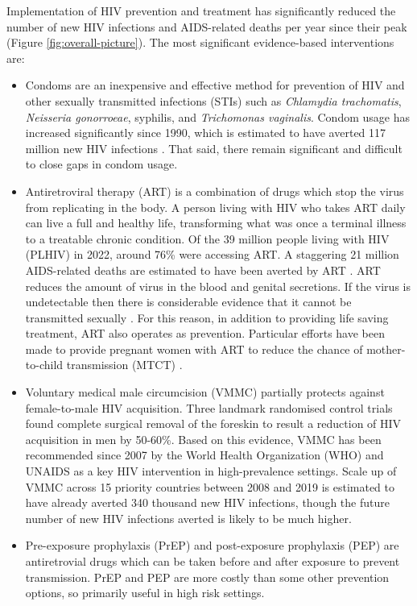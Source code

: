 \documentclass[a4paper, nobind]{templates/ociamthesis}
\providecommand{\tightlist}{%
  \setlength{\itemsep}{0pt}\setlength{\parskip}{0pt}}
\begin{document}
Implementation of HIV prevention and treatment has significantly reduced the number of new HIV infections and AIDS-related deaths per year since their peak (Figure \ref{fig:overall-picture}).
The most significant evidence-based interventions are:

\begin{itemize}
\tightlist
\item
  Condoms are an inexpensive and effective method for prevention of HIV and other sexually transmitted infections (STIs) such as \emph{Chlamydia trachomatis}, \emph{Neisseria gonorroeae}, syphilis, and \emph{Trichomonas vaginalis}.
  Condom usage has increased significantly since 1990, which is estimated to have averted 117 million new HIV infections \autocite{stover2021impact}.
  That said, there remain significant and difficult to close gaps in condom usage.
\item
  Antiretroviral therapy (ART) is a combination of drugs which stop the virus from replicating in the body.
  A person living with HIV who takes ART daily can live a full and healthy life, transforming what was once a terminal illness to a treatable chronic condition.
  Of the 39 million people living with HIV (PLHIV) in 2022, around 76\% were accessing ART.
  A staggering 21 million AIDS-related deaths are estimated to have been averted by ART \autocite{unaids2023global}.
  ART reduces the amount of virus in the blood and genital secretions.
  If the virus is undetectable then there is considerable evidence that it cannot be transmitted sexually \autocite{cohen2011prevention,broyles2023risk}.
  For this reason, in addition to providing life saving treatment, ART also operates as prevention.
  Particular efforts have been made to provide pregnant women with ART to reduce the chance of mother-to-child transmission (MTCT) \autocite{siegfried2011antiretrovirals}.
\item
  Voluntary medical male circumcision (VMMC) partially protects against female-to-male HIV acquisition.
  Three landmark randomised control trials \autocite{auvert2005randomized,gray2007male,bailey2007male} found complete surgical removal of the foreskin to result a reduction of HIV acquisition in men by 50-60\%.
  Based on this evidence, VMMC has been recommended since 2007 by the World Health Organization (WHO) and UNAIDS as a key HIV intervention in high-prevalence settings.
  Scale up of VMMC across 15 priority countries between 2008 and 2019 is estimated to have already averted 340 thousand new HIV infections, though the future number of new HIV infections averted is likely to be much higher.
\item
  Pre-exposure prophylaxis (PrEP) and post-exposure prophylaxis (PEP) are antiretrovial drugs which can be taken before and after exposure to prevent transmission.
  PrEP and PEP are more costly than some other prevention options, so primarily useful in high risk settings.
\end{itemize}
\end{document}
